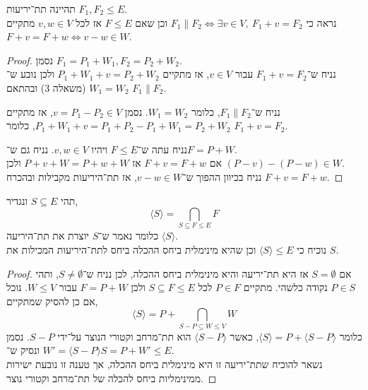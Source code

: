 \question{}
תהיינה תת־יריעות $F_1, F_2 \le E$. \\
נראה כי $F_1 \parallel F_2 \iff \exists v \in V,\ F_1 + v = F_2$ וכן שאם $F \le E$ אז לכל $v, w \in V$ מתקיים $F + v = F + w \iff v - w \in W$.
\begin{proof}
	נסמן $F_1 = P_1 + W_1, F_2 = P_2 + W_2$. \\
	נניח ש־$F_1 + v = F_2$ עבור $v \in V$, אז מתקיים $P_1 + W_1 + v = P_2 + W_2$ ולכן נובע ש־$W_1 = W_2$ (משאלה 3) ובהתאם $F_1 \parallel F_2$.

	נניח ש־$F_1 \parallel F_2$, כלומר $W_1 = W_2$.
	נסמן $v = P_1 - P_2 \in V$, אז מתקיים $P_1 + W_1 + v = P_1 + P_2 - P_1 + W_1 = P_2 + W_2$, כלומר $F_1 + v = F_2$.

	נניח עתה ש־$F \le E$ ויהיו $v, w \in V$.
	נניח גם ש־$F = P + W$. \\
	אם $F + v = F + w$ אז $P + v + W = P + w + W$ ולכן $(P - v) - (P - w) \in W$. \\
	נניח בכיוון ההפוך ש־$v - w \in W$, אז תת־היריעות מקבילות ובהכרח $F + v = F + w$.
\end{proof}

\question{}
תהי $S \subseteq E$ ונגדיר,
\[
	\langle S \rangle
	= \bigcap_{S \subseteq F \le E} F
\]
כלומר נאמר ש־$S$ יוצרת את תת־היריעה $\langle S \rangle$. \\
נוכיח כי $\langle S \rangle \le E$ וכן שהיא מינימלית ביחס ההכלה ביחס לתת־היריעות המכילות את $S$.
\begin{proof}
	אם $S = \emptyset$ אז היא תת־יריעה והיא מינימלית ביחס ההכלה, לכן נניח ש־$S \ne \emptyset$, ותהי $P \in S$ נקודה כלשהי.
	מתקיים $P \in F$ לכל $S \subseteq F \le E$ ולכן $F = P + W$ עבור $W \le V$.
	נוכל אם כן להסיק שמתקיים,
	\[
		\langle S \rangle
		= P + \bigcap_{S - P \subseteq W \le V} W
	\]
	כלומר $\langle S \rangle = P + \langle S - P \rangle$, כאשר $\langle S - P \rangle$ הוא תת־מרחב וקטורי הנוצר על־ידי $S - P$.
	נסמן $W' = \langle S - P \rangle$ ונסיק ש־$S = P + W' \le E$. \\
	נשאר להוכיח שתת־יריעה זו היא מינימלית ביחס ההכלה, אך טענה זו נובעת ישירות ממינימליות ביחס להכלה של תת־מרחב וקטורי נוצר.
\end{proof}



